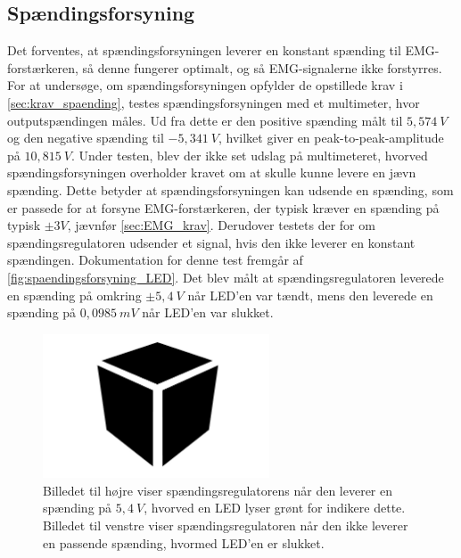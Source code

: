 \subsection{Spændingsforsyning} \label{test_spaendingsforsyning}
Det forventes, at spændingsforsyningen leverer en konstant spænding til EMG-forstærkeren, så denne fungerer optimalt, og så EMG-signalerne ikke forstyrres. For at undersøge, om spændingsforsyningen opfylder de opstillede krav i \ref{sec:krav_spaending}, testes spændingsforsyningen med et multimeter, hvor outputspændingen måles. %
Ud fra dette er den positive spænding målt til $5,574~V$ og den negative spænding til $-5,341~V$, hvilket giver en peak-to-peak-amplitude på $10,815~V$. Under testen, blev der ikke set udslag på multimeteret, hvorved spændingsforsyningen overholder kravet om at skulle kunne levere en jævn spænding. Dette betyder at spændingsforsyningen kan udsende en spænding, som er passede for at forsyne EMG-forstærkeren, der typisk kræver en spænding på typisk $\pm3V$, jævnfør \autoref{sec:EMG_krav}. 
Derudover testets der for om spændingsregulatoren udsender et signal, hvis den ikke leverer en konstant spændingen. Dokumentation for denne test fremgår  af \autoref{fig:spaendingsforsyning_LED}. Det blev målt at spændingsregulatoren leverede en spænding på omkring $\pm5,4~V$ når LED'en var tændt, mens den leverede en spænding på $0,0985~mV$ når LED'en var slukket.


\begin{figure}[H]
\centering
\includegraphics[width=0.6\textwidth]{figures/blackbox}
\caption{Billedet til højre viser spændingsregulatorens når den leverer en spænding på $5,4~V$, hvorved en LED lyser grønt for indikere dette. Billedet til venstre viser spændingsregulatoren når den ikke leverer en passende spænding, hvormed LED'en er slukket.}
\label{fig:spaendingsforsyning_LED}
\end{figure}


